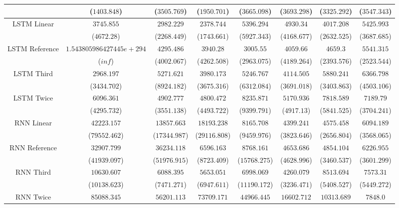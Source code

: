 \begin{table}[!ht]
{\begin{tabular}{|c|c|c|c|c|c|c|c|}
			 & ($1403.848$) & ($3505.769$) & ($1950.701$) & ($3665.098$) & ($3693.298$) & ($3325.292$) & ($3547.343$) \\ \hline
			\multirow{2}{*}{LSTM Linear} & $3745.855$ & $2982.229$ & $2378.744$ & $5396.294$ & $4930.34$ & $4017.208$ & $5425.993$ \\
			 & ($4672.28$) & ($2268.449$) & ($1743.661$) & ($5927.343$) & ($4168.677$) & ($2632.525$) & ($3687.685$) \\ \hline
			\multirow{2}{*}{LSTM Reference} & $1.543805986427445e+294$ & $4295.486$ & $3940.28$ & $3005.55$ & $4059.66$ & $4659.3$ & $5541.315$ \\
			 & ($inf$) & ($4002.067$) & ($4262.508$) & ($2963.075$) & ($4189.264$) & ($2393.576$) & ($2523.544$) \\ \hline
			\multirow{2}{*}{LSTM Third} & $2968.197$ & $5271.621$ & $3980.173$ & $5246.767$ & $4114.505$ & $5880.241$ & $6366.798$ \\
			 & ($3434.702$) & ($8924.182$) & ($3675.316$) & ($6312.084$) & ($3691.018$) & ($3403.863$) & ($4503.106$) \\ \hline
			\multirow{2}{*}{LSTM Twice} & $6096.361$ & $4902.777$ & $4800.472$ & $8235.871$ & $5170.936$ & $7818.589$ & $7189.79$ \\
			 & ($4295.732$) & ($3551.138$) & ($4493.722$) & ($9399.791$) & ($4917.13$) & ($5841.525$) & ($3704.241$) \\ \hline
			\multirow{2}{*}{RNN Linear} & $42223.157$ & $13857.663$ & $18193.238$ & $8165.708$ & $4399.241$ & $4575.458$ & $6094.189$ \\
			 & ($79552.462$) & ($17344.987$) & ($29116.808$) & ($9459.976$) & ($3823.646$) & ($2656.804$) & ($3568.065$) \\ \hline
			\multirow{2}{*}{RNN Reference} & $32907.799$ & $36234.118$ & $6596.163$ & $8768.161$ & $4653.686$ & $4854.104$ & $6226.955$ \\
			 & ($41939.097$) & ($51976.915$) & ($8723.409$) & ($15768.275$) & ($4628.996$) & ($3460.537$) & ($3601.299$) \\ \hline
			\multirow{2}{*}{RNN Third} & $10630.607$ & $6088.395$ & $5653.051$ & $6998.069$ & $4260.079$ & $8513.694$ & $7573.31$ \\
			 & ($10138.623$) & ($7471.271$) & ($6947.611$) & ($11190.172$) & ($3236.471$) & ($5408.527$) & ($5449.272$) \\ \hline
			\multirow{2}{*}{RNN Twice} & $85088.345$ & $56201.113$ & $73709.171$ & $44966.445$ & $16602.712$ & $10313.689$ & $7848.0$ \\

\end{tabular}}
\end{table}

